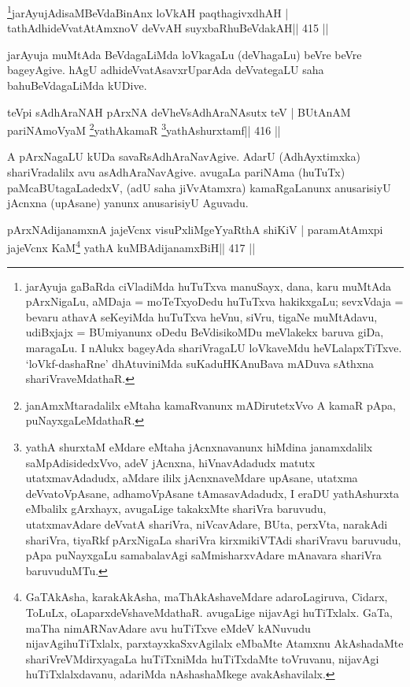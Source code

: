 \begin{shl}
\footnote{jarAyuja gaBaRda ciVladiMda huTuTxva manuSayx, dana, karu muMtAda pArxNigaLu, aMDaja = moTeTxyoDedu huTuTxva hakikxgaLu;  sevxVdaja = bevaru athavA seKeyiMda huTuTxva heVnu, siVru, tigaNe  muMtAdavu, udiBxjajx = BUmiyanunx oDedu BeVdisikoMDu meVlakekx baruva  giDa, maragaLu. I nAlukx bageyAda shariVragaLU loVkaveMdu heVLalapxTiTxve. `loVkf-dashaRne' dhAtuviniMda suKaduHKAnuBava mADuva sAthxna shariVraveMdathaR.}jarAyujAdisaMBeVdaBinAnx loVkAH paqthagivxdhAH |
tathA\s dhideVvatAtAmxnoV deVvAH suyxbaRhuBeVdakAH\hfill || 415 ||
\end{shl}

\begin{artha}
jarAyuja muMtAda BeVdagaLiMda loVkagaLu (deVhagaLu) beVre beVre  bageyAgive. hAgU adhideVvatAsavxrUparAda deVvategaLU saha bahuBeVdagaLiMda kUDive.
\end{artha}

\begin{shl}
teV\s pi sAdhAraNAH pArxNA deVheV\s sAdhAraNAsutx teV |
BUtAnAM pariNAmoV\s yaM \footnote{janAmxMtaradalilx eMtaha kamaRvanunx mADirutetxVvo A  kamaR pApa, puNayxgaLeMdathaR.}yathAkamaR \footnote{yathA shurxtaM eMdare eMtaha jAcnxnavanunx hiMdina  janamxdalilx saMpAdisidedxVvo, adeV jAcnxna, hiVnavAdadudx matutx utatxmavAdadudx, aMdare ililx jAcnxnaveMdare upAsane, utatxma deVvatoVpAsane, adhamoVpAsane tAmasavAdadudx, I eraDU yathAshurxta eMbalilx gArxhayx, avugaLige takakxMte shariVra baruvudu, utatxmavAdare deVvatA shariVra, niVcavAdare, BUta, perxVta, narakAdi shariVra, tiyaRkf pArxNigaLa shariVra kirxmikiVTAdi shariVravu baruvudu, pApa puNayxgaLu samabalavAgi saMmisharxvAdare mAnavara shariVra baruvuduMTu.}yathAshurxtamf\hfill || 416 ||
\end{shl}

\begin{artha}
A pArxNagaLU kUDa savaRsAdhAraNavAgive. AdarU (AdhAyxtimxka) shariVradalilx avu asAdhAraNavAgive. avugaLa pariNAma (huTuTx) paMcaBUtagaLadedxV, (adU saha jiVvAtamxra) kamaRgaLanunx anusarisiyU jAcnxna (upAsane) yanunx anusarisiyU Aguvadu.
\end{artha}

\begin{shl}
pArxNAdijanamxnA jajeVcnx visuPxliMgeYyaRthA shiKiV |
paramAtAmx\s pi jajeVcnx KaM\footnote{GaTAkAsha, karakAkAsha, maThAkAshaveMdare  adaroLagiruva, Cidarx, ToLuLx, oLaparxdeVshaveMdathaR. avugaLige  nijavAgi huTiTxlalx. GaTa, maTha nimARNavAdare avu huTiTxve eMdeV kANuvudu nijavAgihuTiTxlalx, parxtayxkaSxvAgilalx eMbaMte Atamxnu AkAshadaMte shariVreVMdirxyagaLa huTiTxniMda huTiTxdaMte toVruvanu, nijavAgi huTiTxlalxdavanu, adariMda nAshashaMkege avakAshavilalx.} yathA kuMBAdijanamxBiH\hfill || 417 ||
\end{shl}


